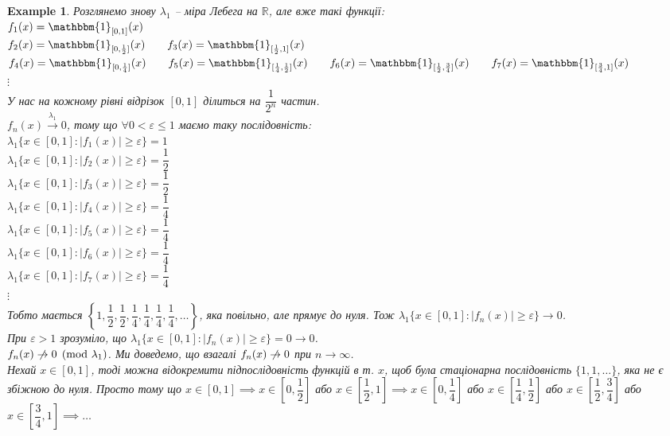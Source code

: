 \documentclass[a4paper, 10pt]{article}
\theoremstyle{theoremdd}
\newtheorem{example}[theorem]{Example}
\newcommand\tomeasure[1]{\overset{{#1}}{\to}}
\begin{document}
\begin{example}
Розглянемо знову $\lambda_1$ -- міра Лебега на $\mathbb{R}$, але вже такі функції:\\
$f_1(x) = \mathbbm{1}_{[0,1]}(x)$\\
$f_2(x) = \mathbbm{1}_{[0,\frac{1}{2}]}(x) \qquad f_3(x) = \mathbbm{1}_{[\frac{1}{2},1]}(x)$\\
$f_4(x) = \mathbbm{1}_{[0,\frac{1}{4}]}(x) \qquad f_5(x) = \mathbbm{1}_{[\frac{1}{4},\frac{1}{2}]}(x) \qquad f_6(x) = \mathbbm{1}_{[\frac{1}{2}, \frac{3}{4}]}(x) \qquad f_7(x) = \mathbbm{1}_{[\frac{3}{4},1]}(x)$\\
$\vdots$\\
У нас на кожному рівні відрізок $[0,1]$ ділиться на $\dfrac{1}{2^n}$ частин.\\
$f_n(x) \tomeasure{\lambda_1} 0$, тому що $\forall 0 < \varepsilon \leq 1$ маємо таку послідовність:\\
$\lambda_1\{x \in [0,1]: |f_1(x)| \geq \varepsilon\} = 1$\\
$\lambda_1\{x \in [0,1]: |f_2(x)| \geq \varepsilon\} = \dfrac{1}{2}$\\
$\lambda_1\{x \in [0,1]: |f_3(x)| \geq \varepsilon\} = \dfrac{1}{2}$\\
$\lambda_1\{x \in [0,1]: |f_4(x)| \geq \varepsilon\} = \dfrac{1}{4}$\\
$\lambda_1\{x \in [0,1]: |f_5(x)| \geq \varepsilon\} = \dfrac{1}{4}$\\
$\lambda_1\{x \in [0,1]: |f_6(x)| \geq \varepsilon\} = \dfrac{1}{4}$\\
$\lambda_1\{x \in [0,1]: |f_7(x)| \geq \varepsilon\} = \dfrac{1}{4}$\\
$\vdots$\\
Тобто мається $\left\{ 1,\dfrac{1}{2},\dfrac{1}{2},\dfrac{1}{4},\dfrac{1}{4},\dfrac{1}{4},\dfrac{1}{4}, \dots \right\}$, яка повільно, але прямує до нуля. Тож $\lambda_1 \{x \in [0,1]: |f_n(x)| \geq \varepsilon\} \to 0$.\\
При $\varepsilon > 1$ зрозуміло, що $\lambda_1 \{x \in [0,1]: |f_n(x)| \geq \varepsilon\} = 0 \to 0$.\\
$f_n(x) \centernot\to 0 \pmod {\lambda_1}$. Ми доведемо, що взагалі $f_n(x) \centernot\to 0$ при $n \to \infty$.\\
Нехай $x \in [0,1]$, тоді можна відокремити підпослідовність функцій в т. $x$, щоб була стаціонарна послідовність $\{1,1,\dots\}$, яка не є збіжною до нуля. Просто тому що $x \in [0,1] \implies x \in \left[ 0, \dfrac{1}{2} \right]$ або $x \in \left[ \dfrac{1}{2},1 \right] \implies x \in \left[ 0, \dfrac{1}{4} \right]$ або $x \in \left[ \dfrac{1}{4},\dfrac{1}{2} \right]$ або $x \in \left[ \dfrac{1}{2},\dfrac{3}{4} \right]$ або $x \in \left[ \dfrac{3}{4},1 \right] \implies \dots$
\end{example}
\end{document}
